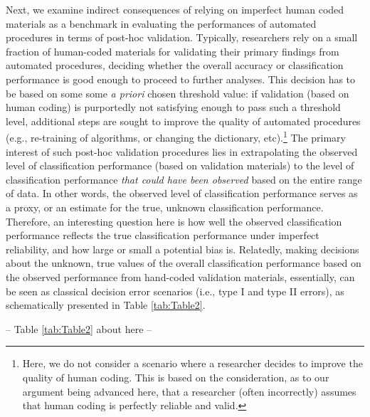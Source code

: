 \documentclass[man, 12pt, a4paper, nolmodern, noextraspace]{apa6}
\begin{document}
Next, we examine indirect consequences of relying on imperfect human coded materials as a benchmark in evaluating the performances of automated procedures in terms of post-hoc validation. Typically, researchers rely on a small fraction of human-coded materials for validating their primary findings from automated procedures, deciding whether the overall accuracy or classification performance is good enough to proceed to further analyses. This decision has to be based on some some \textit{a priori} chosen threshold value: if validation (based on human coding) is purportedly not satisfying enough to pass such a threshold level, additional steps are sought to improve the quality of automated procedures (e.g., re-training of algorithms, or changing the dictionary, etc).\footnote{Here, we do not consider a scenario where a researcher decides to improve the quality of human coding. This is based on the consideration, as to our argument being advanced here, that a researcher (often incorrectly) assumes that human coding is perfectly reliable and valid.} The primary interest of such post-hoc validation procedures lies in extrapolating the observed level of classification performance (based on validation materials) to the level of classification performance \textit{that could have been observed} based on the entire range of data. In other words, the observed level of classification performance serves as a proxy, or an estimate for the true, unknown classification performance. Therefore, an interesting question here is how well the observed classification performance reflects the true classification performance under imperfect reliability, and how large or small a potential bias is. Relatedly, making decisions about the unknown, true values of the overall classification performance based on the observed performance from hand-coded validation materials, essentially, can be seen as classical decision error scenarios (i.e., type I and type II errors), as schematically presented in Table \ref{tab:Table2}.
\centerline{ -- Table \ref{tab:Table2} about here -- }    
\end{document}
